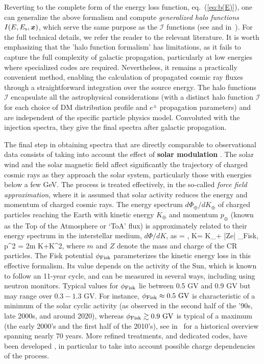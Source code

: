   
Reverting to the complete form of the energy loss function, eq.~(\ref{eq:b(E)}), one can generalize the above formalism and compute {\em generalized halo functions} $I(E, E_{\rm s}, \vec x)$,
which serve the same purpose as the $\mathcal{I}$ functions (see \cite{PPPC4DMID} and 
 in~\cite{CRenergylosses}). 
For the full technical details, we refer the reader to the relevant literature. 
It is worth emphasizing that the 'halo function formalism' has limitations, as it fails to capture the full complexity of galactic propagation, particularly at low energies where specialized codes are required. Nevertheless, it remains a practically convenient method, enabling the calculation of propagated cosmic ray fluxes through a straightforward integration over the source energy.
 The halo functions $\mathcal{I}$ encapsulate all the astrophysical considerations (with a distinct halo function $\mathcal{I}$ for each choice of DM distribution profile and $e^\pm$ propagation parameters) and are independent of the specific  particle physics model. Convoluted with the injection spectra, they give the final spectra after galactic propagation. 

\medskip

\label{solar_modulation}
The final step in obtaining spectra that are directly comparable to observational data consists of taking into account the effect of {\bf solar modulation} \cite{SolarMod}.
The solar wind and the solar magnetic field  affect significantly the trajectory of charged cosmic rays as they approach the solar system, particularly those with energies below a few GeV.
The process is treated effectively, in the so-called {\em force field approximation}, 
where it is assumed that solar activity reduces the energy and momentum of charged cosmic rays.
The energy spectrum $d\Phi_{\oplus}/dK_\oplus$ of charged particles reaching the Earth with kinetic energy $K_\oplus$ and momentum $p_\oplus$ (known as the Top of the Atmosphere or `ToA' flux) is approximately related to their energy spectrum in the interstellar medium, $d\Phi/dK$, as  \label{solarmod}
\beq 
{} =  ,\qquad
K= K_\oplus + |Ze| \phi_{\rm Fisk}, \qquad
p^2 = 2m K+K^2,
\eeq
where $m$ and $Z$ denote the mass and charge of the 
CR particles.
The Fisk potential $\phi_{\rm Fisk}$ parameterizes the kinetic energy loss in this effective formalism. Its value depends on the activity of the Sun, which is known to follow  an 11-year cycle, and can be measured in several ways, including using neutron monitors.  
Typical values for $\phi_{\rm Fisk}$ lie between 0.5 GV and 0.9 GV but may range over $0.3-1.3$ GV. 
For instance, $\phi_{\rm Fisk} \approx 0.5\ {\rm GV}$ is characteristic of a minimum of the solar cyclic activity 
(as observed in the second half of the '90s, late 2000s, and around 2020), whereas
$\phi_{\rm Fisk} \gtrsim 0.9\ {\rm GV}$ is typical of a maximum (the early 2000's and the first half of the 2010's), 
see   in~\cite{SolarMod} for a historical overview spanning nearly 70 years.
More refined treatments, and dedicated codes, have been developed \cite{SolarMod}, in particular to take into account possible charge dependencies of the process.


